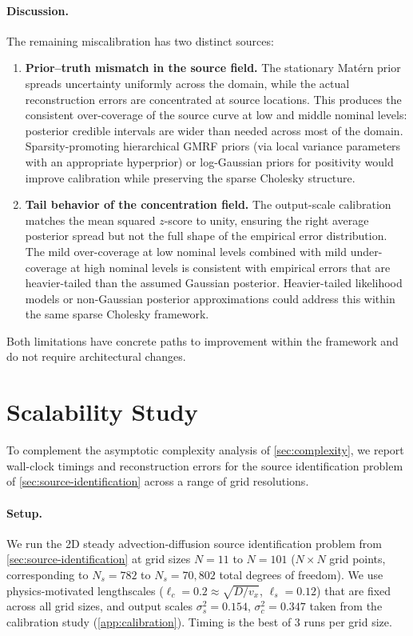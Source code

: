 \documentclass{article}
\theoremstyle{plain}
\theoremstyle{definition}
\theoremstyle{remark}
\begin{document}
\paragraph{Discussion.}
The remaining miscalibration has two distinct sources:
\begin{enumerate}
    \item \textbf{Prior--truth mismatch in the source field.}  The stationary Mat\'ern prior spreads uncertainty uniformly across the domain, while the actual reconstruction errors are concentrated at source locations.  This produces the consistent over-coverage of the source curve at low and middle nominal levels: posterior credible intervals are wider than needed across most of the domain.  Sparsity-promoting hierarchical GMRF priors (via local variance parameters with an appropriate hyperprior) or log-Gaussian priors for positivity would improve calibration while preserving the sparse Cholesky structure.
    \item \textbf{Tail behavior of the concentration field.}  The output-scale calibration matches the mean squared $z$-score to unity, ensuring the right average posterior spread but not the full shape of the empirical error distribution.  The mild over-coverage at low nominal levels combined with mild under-coverage at high nominal levels is consistent with empirical errors that are heavier-tailed than the assumed Gaussian posterior.  Heavier-tailed likelihood models or non-Gaussian posterior approximations could address this within the same sparse Cholesky framework.
\end{enumerate}
Both limitations have concrete paths to improvement within the framework and do not require architectural changes.

\section{Scalability Study}
\label{app:scalability}

To complement the asymptotic complexity analysis of \cref{sec:complexity}, we report wall-clock timings and reconstruction errors for the source identification problem of \cref{sec:source-identification} across a range of grid resolutions.

\paragraph{Setup.}
We run the 2D steady advection-diffusion source identification problem from \cref{sec:source-identification} at grid sizes $N = 11$ to $N = 101$ ($N \times N$ grid points, corresponding to $N_s = 782$ to $N_s = 70{,}802$ total degrees of freedom).  We use physics-motivated lengthscales ($\ell_c = 0.2 \approx \sqrt{D/v_x}$, $\ell_s = 0.12$) that are fixed across all grid sizes, and output scales $\sigma^2_s = 0.154$, $\sigma^2_c = 0.347$ taken from the calibration study (\cref{app:calibration}).  Timing is the best of 3 runs per grid size.
\end{document}
